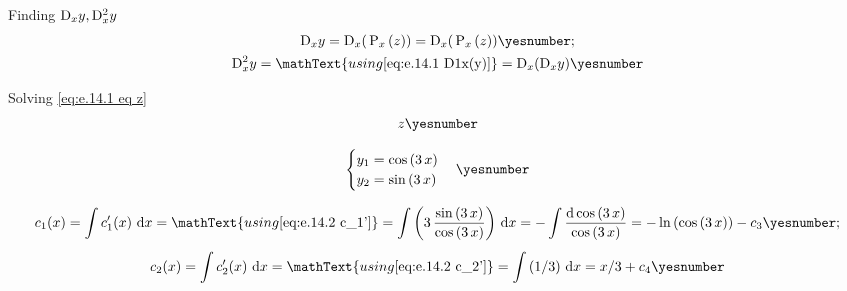 \documentclass["AM3C-Slides_annotations.tex"]{subfiles}
\begin{document}
\begin{exampleBox}
\begin{sectionBox}
    Finding \(
      \mdif{x}{y},
      \mdif[2]{x}{y}
    \)
    \begin{gather*}
      \mdif{x}{y}
      = \mdif{x}{(
        \,\prim_x{(z)}
      )}
      = \mdif{x}{(
        \,\prim_x{(z)}
      )}
      \yesnumber\label{eq:e.14.1 D1x(y)}
      ;\\
      \mdif[2]{x}{y}
      = \mathText{using \eqref{eq:e.14.1 D1x(y)}}
      = \mdif{x}{\left(
        \mdif{x}{y}
      \right)}
      \yesnumber\label{eq:e.14.1 D2x(y)}
    \end{gather*}

    Solving \eqref{eq:e.14.1 eq z}
    \begin{gather*}
      z
      \yesnumber\label{eq:e.14.1 z}
    \end{gather*}
    
  \end{sectionBox}

  \begin{gather*}
    \begin{cases}
      y_1 = \cos{(3\,x)}
      \\
      y_2 = \sin{(3\,x)}
    \end{cases}
    \yesnumber\label{eq:e.14.2 y_1 y_2}
  \end{gather*}

  \begin{gather*}
    c_1(x) 
    = \int{c_1'(x)\,\odif{x}}
    = \mathText{using \eqref{eq:e.14.2 c_1'}}
    = \int{\left(
        3\,\frac{\sin{(3\,x)}}{\cos{(3\,x)}}
    \right)\,\odif{x}}
    = -\int{
      \frac{\odif{\cos{(3\,x)}}}{\cos{(3\,x)}}
    }
    = -\ln{(\cos{(3\,x)})}-c_3
    \yesnumber\label{eq:e.14.2 c_1}
    ; \\[1ex]
    c_2(x) 
    = \int{c_2'(x)\,\odif{x}}
    = \mathText{using \eqref{eq:e.14.2 c_2'}}
    = \int{( 1/3)\,\odif{x}}
    = x/3 + c_4
    \yesnumber\label{eq:e.14.2 c_2}
  \end{gather*}


\end{exampleBox}
\end{document}
